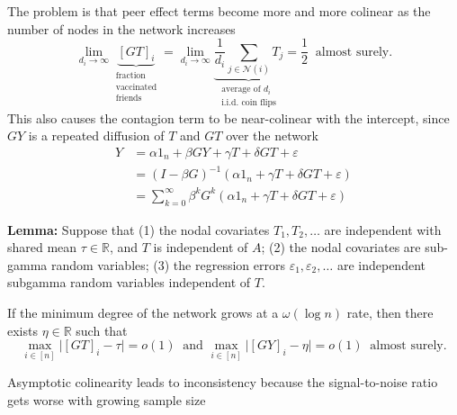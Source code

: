 \documentclass[final]{beamer}
\newcommand{\Ni}{\mathcal N(i)}
\newcommand{\R}{\mathbb{R}}
\newlength{\colwidth}
\begin{document}
\begin{frame}[t]
\begin{columns}[t]
\begin{column}{\colwidth}
\begin{block}{The problem is that peer effect terms become more and more colinear as the number of nodes in the network increases}
                \begin{equation} \label{eq:avg}
                    \lim_{d_i \to \infty}
                    \underbrace{[GT]_i}_{\substack{\text{fraction} \\ \text{vaccinated} \\ \text{friends}}}
                    =
                    \lim_{d_i \to \infty}
                    \underbrace{
                        \frac{1}{d_i} \sum_{j \in \Ni} T_j
                    }_{\substack{\text{average of $d_i$}           \\ \text{i.i.d. coin flips}}}
                    = \frac 12 ~ \text{ almost surely.}
                \end{equation}
                This also causes the contagion term to be near-colinear with the intercept, since $GY$ is a repeated diffusion of $T$ and $GT$ over the network
                \begin{align*}
                    Y & = \alpha 1_n + \beta G Y + \gamma T + \delta G T + \varepsilon                                \\
                      & = \left(I - \beta G\right)^{-1} \left(\alpha 1_n + \gamma T + \delta G T + \varepsilon\right) \\
                      & = \sum_{k=0}^\infty \beta^k G^k \left(\alpha 1_n + \gamma T + \delta G T + \varepsilon\right)
                \end{align*}

                \textbf{Lemma:} Suppose that (1) the nodal covariates $T_1, T_2, \dots$ are independent with shared mean $\tau \in \R$, and $T$ is independent of $A$; (2) the nodal covariates are sub-gamma random variables; (3) the regression errors $\varepsilon_1, \varepsilon_2, \dots$ are independent subgamma random variables independent of $T$.

                If the minimum degree of the network grows at a $\omega(\log n)$ rate, then there exists $\eta \in \R$ such that
                \begin{equation*}
                    \max_{i \in [n]} \Big| [GT]_i - \tau \Big|
                    = o(1) ~ \text{ and }
                    \max_{i \in [n]} \Big| [GY]_i - \eta \Big| = o(1)~ \text{ almost surely.}
                \end{equation*}
            \end{block}

            \begin{block}{Asymptotic colinearity leads to inconsistency because the signal-to-noise ratio gets worse with growing sample size}


\end{block}
\end{column}
\end{columns}
\end{frame}
\end{document}

